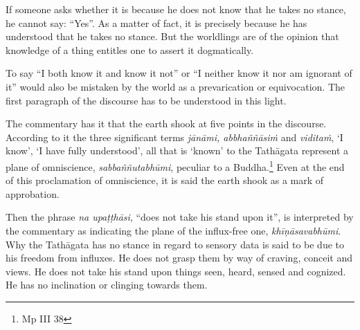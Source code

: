 If someone asks whether it is because he does not know that he takes no stance, he cannot say: ``Yes''. As a matter of fact, it is precisely because he has understood that he takes no stance. But the worldlings are of the opinion that knowledge of a thing entitles one to assert it dogmatically.

To say ``I both know it and know it not'' or ``I neither know it nor am ignorant of it'' would also be mistaken by the world as a prevarication or equivocation. The first paragraph of the discourse has to be understood in this light.

The commentary has it that the earth shook at five points in the discourse. According to it the three significant terms \emph{jānāmi, abbhaññāsiṁ} and \emph{viditaṁ}, `I know', `I have fully understood', all that is `known' to the Tathāgata represent a plane of omniscience, \emph{sabbaññutabhūmi}, peculiar to a Buddha.\footnote{Mp III 38} Even at the end of this proclamation of omniscience, it is said the earth shook as a mark of approbation.

Then the phrase \emph{na upaṭṭhāsi}, ``does not take his stand upon it'', is interpreted by the commentary as indicating the plane of the influx-free one, \emph{khīṇāsavabhūmi}. Why the Tathāgata has no stance in regard to sensory data is said to be due to his freedom from influxes. He does not grasp them by way of craving, conceit and views. He does not take his stand upon things seen, heard, sensed and cognized. He has no inclination or clinging towards them.
